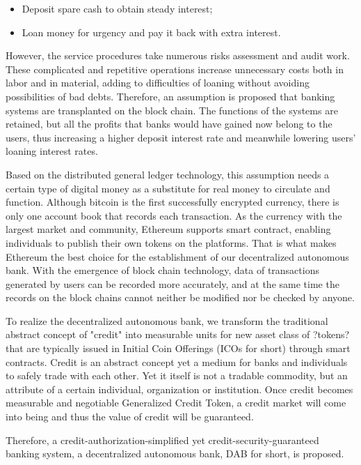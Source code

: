 \documentclass[a4paper, 10pt, conference]{ieeeconf} %
\begin{document}
\begin{itemize} 
   \item Deposit spare cash to obtain steady interest;\label{block:prevhash}
   \item Loan money for urgency and pay it back with extra interest.\label{block:txtree}
\end{itemize}

However, the service procedures take numerous risks assessment and audit work. These complicated and repetitive operations increase unnecessary costs both in labor and in material, adding to difficulties of loaning without avoiding possibilities of bad debts. Therefore, an assumption is proposed that banking systems are transplanted on the block chain. The functions of the systems are retained, but all the profits that banks would have gained now belong to the users, thus increasing a higher deposit interest rate and meanwhile lowering users' loaning interest rates.

Based on the distributed general ledger technology, this assumption needs a certain type of digital money as a substitute for real money to circulate and function. Although bitcoin is the first successfully encrypted currency, there is only one account book that records each transaction. As the currency with the largest market and community, Ethereum supports smart contract, enabling individuals to publish their own tokens on the platforms. That is what makes Ethereum the best choice for the establishment of our decentralized autonomous bank. With the emergence of block chain technology, data of transactions generated by users can be recorded more accurately, and at the same time the records on the block chains cannot neither be modified nor be checked by anyone.

To realize the decentralized autonomous bank, we transform the traditional abstract concept of "credit" into measurable units for new asset class of ?tokens? that are typically issued in Initial Coin Offerings (ICOs for short) through smart contracts. Credit is an abstract concept yet a medium for banks and individuals to safely trade with each other. Yet it itself is not a tradable commodity, but an attribute of a certain individual, organization or institution. Once credit becomes measurable and negotiable Generalized Credit Token, a credit market will come into being and thus the value of credit will be guaranteed.

Therefore, a credit-authorization-simplified yet credit-security-guaranteed banking system, a decentralized autonomous bank, DAB for short, is proposed.
\end{document}
